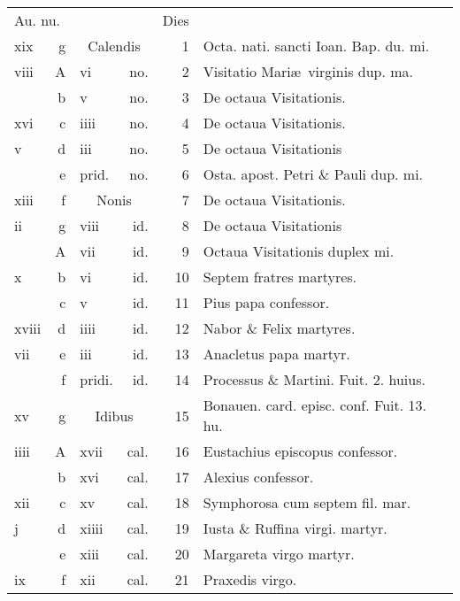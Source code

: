 \documentclass[a5paper,10pt]{book}
\begin{document}
\begin{center}
\begin{tabular}{l r l r r l}
\multicolumn{2}{l}{\color{red}Au. nu.} & & & \color{red} Dies & \\
xix & g & \multicolumn{2}{c}{\color{red} Calendis} & 1 & Octa. nati. sancti Ioan. Bap. du. mi. \color{black} \\
viii & \color{red} A & vi & no. & 2 & \color{red} Visitatio Mari\ae \ virginis dup. ma. \color{black} \\
 & b & v & no. & 3 & De octaua Visitationis. \color{black} \\
xvi & c & iiii & no. & 4 & De octaua Visitationis. \color{black} \\
v & d & iii & no. & 5 & De octaua Visitationis \color{black} \\
 & e & \color{red} prid. & no. & 6 & Osta. apost. Petri \& Pauli dup. mi. \color{black} \\
xiii & f & \multicolumn{2}{c}{\color{red} Nonis} & 7 & De octaua Visitationis. \\
ii & g & viii & id. & 8 & De octaua Visitationis \color{black} \\
 & \color{red} A & vii & id. & 9 & Octaua Visitationis duplex mi. \color{black} \\
x & b & vi & id. & 10 & Septem fratres martyres. \color{black} \\
 & c & v & id. & 11 & Pius papa confessor. \\
xviii & d & iiii & id. & 12 & Nabor \& Felix martyres. \color{black}\\
vii & e & iii & id. & 13 & Anacletus papa martyr. \\
 & f & \color{red} pridi. & id. & 14 & Processus \& Martini. \color{red} Fuit. 2. huius. \color{black} \\
xv & g & \multicolumn{2}{c}{\color{red} Idibus} & 15 & Bonauen. card. episc. conf. \color{red} Fuit. 13. hu. \color{black} \\
iiii & \color{red} A & xvii & cal. & 16 & Eustachius episcopus confessor. \\
 & b & xvi & cal. & 17 & Alexius confessor. \\
xii & c & xv & cal. & 18 & Symphorosa cum septem fil. mar. \\
j & d & xiiii & cal. & 19 & Iusta \& Ruffina virgi. martyr. \\
 & e & xiii & cal. & 20 & Margareta virgo martyr. \\
ix & f & xii & cal. & 21 & Praxedis virgo. \\

\end{tabular}
\end{center}
\end{document}
